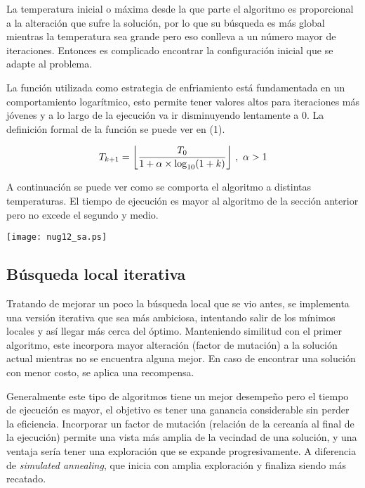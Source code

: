 La temperatura inicial o máxima desde la que parte el algoritmo es proporcional a la alteración que sufre la solución, por lo que su búsqueda es más global mientras la temperatura sea grande pero eso conlleva a un número mayor de iteraciones. Entonces es complicado encontrar la configuración inicial que se adapte al problema.

La función utilizada como estrategia de enfriamiento está fundamentada en un comportamiento logarítmico\cite{aarts1989simulated}, esto permite tener valores altos para iteraciones más jóvenes y a lo largo de la ejecución va ir disminuyendo lentamente a 0. La definición formal de la función se puede ver en (1).

\begin{equation}
  T_{k+1} = \floor*{ \frac{T_0}{1 + \alpha\times\log_{10} (1 + k) }}\ ,\ \alpha > 1  
\end{equation}

A continuación se puede ver como se comporta el algoritmo a distintas temperaturas. El tiempo de ejecución es mayor al algoritmo de la sección anterior pero no excede el segundo y medio.
 
\begin{center}
    \texttt{[image: nug12\_sa.ps]}
\end{center}

\subsection*{Búsqueda local iterativa}

Tratando de mejorar un poco la búsqueda local que se vio antes, se implementa una versión iterativa que sea más ambiciosa, intentando salir de los mínimos locales y así llegar más cerca del óptimo. Manteniendo similitud con el primer algoritmo, este incorpora mayor alteración (factor de mutación) a la solución actual mientras no se encuentra alguna mejor. En caso de encontrar una solución con menor costo, se aplica una recompensa.

Generalmente este tipo de algoritmos tiene un mejor desempeño pero el tiempo de ejecución es mayor, el objetivo es tener una ganancia considerable sin perder la eficiencia. Incorporar un factor de mutación (relación de la cercanía al final de la ejecución) permite una vista más amplia de la vecindad de una solución, y una ventaja sería tener una exploración que se expande progresivamente. A diferencia de \textit{simulated annealing}, que inicia con amplia exploración y finaliza siendo más recatado.

